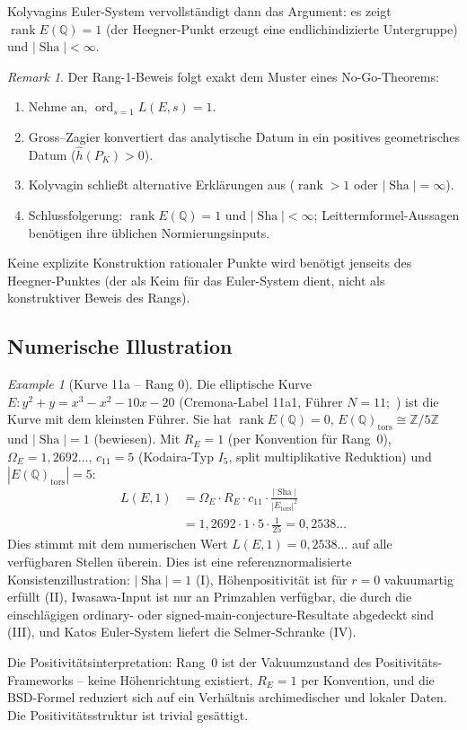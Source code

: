 \documentclass[aps,prd,twocolumn,superscriptaddress,nofootinbib,floatfix]{revtex4-2}
\theoremstyle{definition}
\theoremstyle{remark}
\newtheorem{remark}[theorem]{Remark}
\newtheorem{example}[theorem]{Example}
\DeclareMathOperator{\ord}{ord}
\DeclareMathOperator{\rank}{rank}
\DeclareMathOperator{\Sha}{Sha}
\begin{document}
Kolyvagins Euler-System vervollständigt dann das Argument: es zeigt $\rank E(\mathbb{Q}) = 1$ (der Heegner-Punkt erzeugt eine endlichindizierte Untergruppe) und $|\Sha| < \infty$.

\begin{remark}
Der Rang-1-Beweis folgt exakt dem Muster eines No-Go-Theorems:
\begin{enumerate}
\item Nehme an, $\ord_{s=1} L(E,s) = 1$.
\item Gross--Zagier konvertiert das analytische Datum in ein positives geometrisches Datum ($\hat{h}(P_K) > 0$).
\item Kolyvagin schließt alternative Erklärungen aus ($\rank > 1$ oder $|\Sha| = \infty$).
\item Schlussfolgerung: $\rank E(\mathbb{Q}) = 1$ und $|\Sha| < \infty$; Leittermformel-Aussagen benötigen ihre üblichen Normierungsinputs.
\end{enumerate}
Keine explizite Konstruktion rationaler Punkte wird benötigt jenseits des Heegner-Punktes (der als \glqq Keim\grqq{} für das Euler-System dient, nicht als konstruktiver Beweis des Rangs).
\end{remark}

\subsection{Numerische Illustration}

\begin{example}[Kurve 11a -- Rang 0]
\label{ex:11a}
Die elliptische Kurve $E: y^2 + y = x^3 - x^2 - 10x - 20$ (Cremona-Label 11a1, Führer $N = 11$;~\cite{LMFDB}) ist die Kurve mit dem kleinsten Führer. Sie hat $\rank E(\mathbb{Q}) = 0$, $E(\mathbb{Q})_{\mathrm{tors}} \cong \mathbb{Z}/5\mathbb{Z}$ und $|\Sha| = 1$ (bewiesen). Mit $R_E = 1$ (per Konvention für Rang~0), $\Omega_E = 1{,}2692\ldots$, $c_{11} = 5$ (Kodaira-Typ $I_5$, split multiplikative Reduktion) und $|E(\mathbb{Q})_{\mathrm{tors}}| = 5$:
\[
\begin{aligned}
  L(E,1)
  &= \Omega_E \cdot R_E \cdot c_{11}
     \cdot \frac{|\Sha|}{|E_{\mathrm{tors}}|^2} \\
  &= 1{,}2692 \cdot 1 \cdot 5 \cdot \frac{1}{25}
   = 0{,}2538\ldots
\end{aligned}
\]
Dies stimmt mit dem numerischen Wert $L(E,1) = 0{,}2538\ldots$ auf alle verfügbaren Stellen überein. Dies ist eine referenznormalisierte Konsistenzillustration: $|\Sha| = 1$ (I), Höhenpositivität ist für $r = 0$ vakuumartig erfüllt (II), Iwasawa-Input ist nur an Primzahlen verfügbar, die durch die einschlägigen ordinary- oder signed-main-conjecture-Resultate abgedeckt sind (III), und Katos Euler-System liefert die Selmer-Schranke (IV).

Die Positivitätsinterpretation: Rang~0 ist der \glqq Vakuumzustand\grqq{} des Positivitäts-Frameworks -- keine Höhenrichtung existiert, $R_E = 1$ per Konvention, und die BSD-Formel reduziert sich auf ein Verhältnis archimedischer und lokaler Daten. Die Positivitätsstruktur ist trivial gesättigt.
\end{example}
\end{document}
